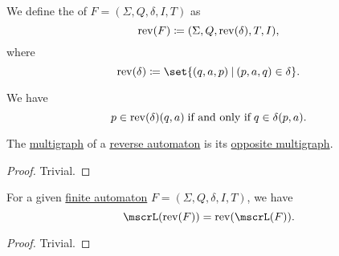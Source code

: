 \begin{definition}\label{def:reverse_finite_automaton}\mimprovised
  We define the  of \( F = (\Sigma, Q, \delta, I, T) \) as
  \begin{equation*}
    \operatorname{rev}(F) \coloneqq (\Sigma, Q, \operatorname{rev}(\delta), T, I),
  \end{equation*}
  where
  \begin{equation*}
    \op{rev}(\delta) \coloneqq \set{ (q, a, p) \given (p, a, q) \in \delta }.
  \end{equation*}
\end{definition}
\begin{comments}
  \item We have
  \begin{equation*}
    p \in \op{rev}(\delta)(q, a) \T{if and only if} q \in \delta(p, a).
  \end{equation*}
\end{comments}

\begin{proposition}\label{thm:reverse_finite_automaton_graph}
  The \hyperref[def:finite_automaton/graph]{multigraph} of a \hyperref[def:reverse_finite_automaton]{reverse automaton} is its \hyperref[def:opposite_directed_multigraph]{opposite multigraph}.
\end{proposition}
\begin{proof}
  Trivial.
\end{proof}

\begin{proposition}\label{thm:reverse_finite_automaton_language}
  For a given \hyperref[def:finite_automaton]{finite automaton} \( F = (\Sigma, Q, \delta, I, T) \), we have
  \begin{equation*}
    \mscrL(\op{rev}(F)) = \op{rev}(\mscrL(F)).
  \end{equation*}
\end{proposition}
\begin{proof}
  Trivial.
\end{proof}

